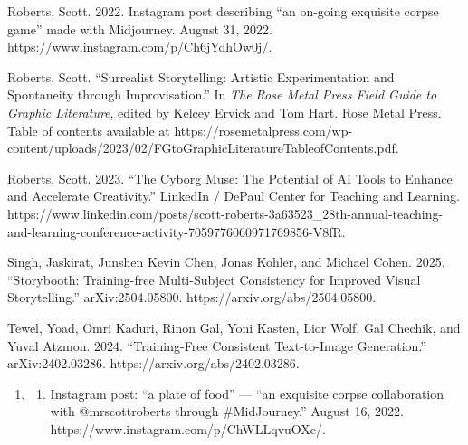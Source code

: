 \documentclass[
]{article}
\providecommand{\tightlist}{%
  \setlength{\itemsep}{0pt}\setlength{\parskip}{0pt}}
\begin{document}
Roberts, Scott. 2022. Instagram post describing ``an on-going exquisite
corpse game'' made with Midjourney. August 31, 2022.
https://www.instagram.com/p/Ch6jYdhOw0j/.

Roberts, Scott. ``Surrealist Storytelling: Artistic Experimentation and
Spontaneity through Improvisation.'' In \emph{The Rose Metal Press Field
Guide to Graphic Literature}, edited by Kelcey Ervick and Tom Hart. Rose
Metal Press. Table of contents available at
https://rosemetalpress.com/wp-content/uploads/2023/02/FGtoGraphicLiteratureTableofContents.pdf.

Roberts, Scott. 2023. ``The Cyborg Muse: The Potential of AI Tools to
Enhance and Accelerate Creativity.'' LinkedIn / DePaul Center for
Teaching and Learning.
https://www.linkedin.com/posts/scott-roberts-3a63523\_28th-annual-teaching-and-learning-conference-activity-7059776060971769856-V8fR.

Singh, Jaskirat, Junshen Kevin Chen, Jonas Kohler, and Michael Cohen.
2025. ``Storybooth: Training-free Multi-Subject Consistency for Improved
Visual Storytelling.'' arXiv:2504.05800.
https://arxiv.org/abs/2504.05800.

Tewel, Yoad, Omri Kaduri, Rinon Gal, Yoni Kasten, Lior Wolf, Gal
Chechik, and Yuval Atzmon. 2024. ``Training-Free Consistent
Text-to-Image Generation.'' arXiv:2402.03286.
https://arxiv.org/abs/2402.03286.

\begin{enumerate}
\def\labelenumi{\arabic{enumi}.}
\tightlist
\item
  \begin{enumerate}
  \def\labelenumii{\arabic{enumii}.}
  \setcounter{enumii}{2021}
  \tightlist
  \item
    Instagram post: ``a plate of food'' --- ``an exquisite corpse
    collaboration with @mrscottroberts through \#MidJourney.'' August
    16, 2022. https://www.instagram.com/p/ChWLLqvuOXe/.
  \end{enumerate}
\end{enumerate}
\end{document}
